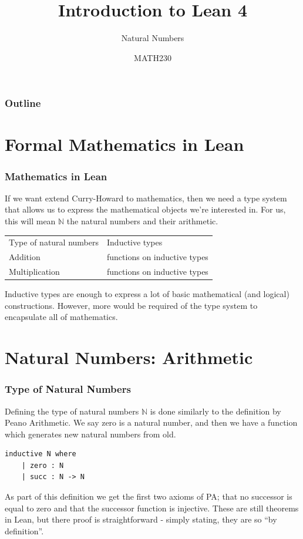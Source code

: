 \documentclass{beamer}
\title{Introduction to Lean 4}
\subtitle{Natural Numbers}
\author{MATH230}
\institute{School of Mathematics and Statistics \\ University of Canterbury}
\date{}
\theoremstyle{indentDefn} \newtheorem{defn}[]{Definition}
\begin{document}
\begin{frame}

  \titlepage

\end{frame}

\begin{frame}
  \frametitle{Outline}

  \tableofcontents

\end{frame}

\section{Formal Mathematics in Lean}

\begin{frame}
	\frametitle{Mathematics in Lean}
	
	If we want extend Curry-Howard to mathematics, then we need a type system that allows us to express the mathematical objects we're interested in. For us, this will mean $\mathbb{N}$ the natural numbers and their arithmetic. 
	
	\begin{center}
		\begin{tabular}{l || l}
			Type of natural numbers & Inductive types \\
			Addition & functions on inductive types \\
			Multiplication & functions on inductive types 	
		\end{tabular}
	\end{center}
	
	Inductive types are enough to express a lot of basic mathematical (and logical) constructions. However, more would be required of the type system to encapsulate all of mathematics.
\end{frame}

\section{Natural Numbers: Arithmetic}

\begin{frame}[fragile]
	\frametitle{Type of Natural Numbers}
	
	Defining the type of natural numbers $\mathbb{N}$ is done similarly to the definition by Peano Arithmetic. We say zero is a natural number, and then we have a function which generates new natural numbers from old. 
	
	\begin{lstlisting}
inductive N where
	| zero : N      
	| succ : N -> N	
	\end{lstlisting}
	
	As part of this definition we get the first two axioms of PA; that no successor is equal to zero and that the successor function is injective. These are still theorems in Lean, but there proof is straightforward - simply stating, they are so ``by definition''.
\end{frame}
\end{document}
